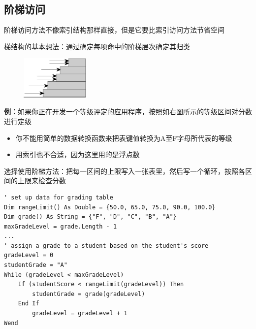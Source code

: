 \subsection{阶梯访问}
阶梯访问方法不像索引结构那样直接，但是它要比索引访问方法节省空间

梯结构的基本想法：通过确定每项命中的阶梯层次确定其归类
\begin{figure}[H]
    \vspace{-0.5em}
	\centering
	\includegraphics[width=0.3\textwidth]{images/阶梯访问.png}
    \vspace{-1em}
\end{figure}


\begin{table}
    \centering
    \vspace{-1.5em}
    \vspace{-1.5em}
\end{table}

\textbf{例：}如果你正在开发一个等级评定的应用程序，按照如右图所示的等级区间对分数进行定级
\begin{itemize}
    \item 你不能用简单的数据转换函数来把表键值转换为A至F字母所代表的等级
    \item 用索引也不合适，因为这里用的是浮点数
\end{itemize}


选择使用阶梯方法：把每一区间的上限写入一张表里，然后写一个循环，按照各区间的上限来检查分数
\begin{lstlisting}
' set up data for grading table
Dim rangeLimit() As Double = {50.0, 65.0, 75.0, 90.0, 100.0}
Dim grade() As String = {"F", "D", "C", "B", "A"}
maxGradeLevel = grade.Length - 1
...
' assign a grade to a student based on the student's score
gradeLevel = 0
studentGrade = "A"
While (gradeLevel < maxGradeLevel)
    If (studentScore < rangeLimit(gradeLevel)) Then
        studentGrade = grade(gradeLevel)
    End If
        gradeLevel = gradeLevel + 1
Wend
\end{lstlisting}